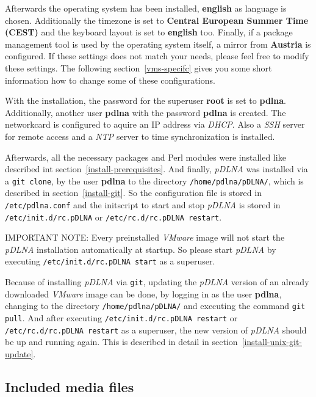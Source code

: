 \documentclass[a4paper,oneside,10pt]{report}
\newenvironment{colframeimportantnote}{%
  \begin{Sbox}
    \begin{minipage}{.99\columnwidth}
}{%
  \end{minipage}
  \end{Sbox}
  \begin{center}
    \fcolorbox{black}{Orange}{\TheSbox}
  \end{center}
}
\begin{document}
Afterwards the operating system has been installed, \textbf{english} as language is chosen. Additionally the timezone is set to \textbf{Central European Summer Time (CEST)} and the keyboard layout is set to \textbf{english} too. Finally, if a package management tool is used by the operating system itself, a mirror from \textbf{Austria} is configured. If these settings does not match your needs, please feel free to modify these settings. The following section~\ref{vms-specifc} gives you some short information how to change some of these configurations.

With the installation, the password for the superuser \textbf{root} is set to \textbf{pdlna}. Additionally, another user \textbf{pdlna} with the password \textbf{pdlna} is created. The networkcard is configured to aquire an IP address via {\em DHCP}. Also a {\em SSH} server for remote access and a {\em NTP} server to time synchronization is installed.

Afterwards, all the necessary packages and Perl modules were installed like described int section~\ref{install-prerequisites}. And finally, {\em pDLNA} was installed via a \verb|git clone|, by the user \textbf{pdlna} to the directory \verb|/home/pdlna/pDLNA/|, which is described in section~\ref{install-git}. So the configuration file is stored in \verb|/etc/pdlna.conf| and the initscript to start and stop {\em pDLNA} is stored in \verb|/etc/init.d/rc.pDLNA| or \verb|/etc/rc.d/rc.pDLNA restart|.

\begin{colframeimportantnote}
\textsc{IMPORTANT NOTE:} Every preinstalled {\em VMware} image will not start the {\em pDLNA} installation automatically at startup. So please start {\em pDLNA} by executing \verb|/etc/init.d/rc.pDLNA start| as a superuser.
\end{colframeimportantnote}

Because of installing {\em pDLNA} via \verb|git|, updating the {\em pDLNA} version of an already downloaded {\em VMware} image can be done, by logging in as the user \textbf{pdlna}, changing to the directory \verb|/home/pdlna/pDLNA/| and executing the command \verb|git pull|. And after executing \verb|/etc/init.d/rc.pDLNA restart| or \verb|/etc/rc.d/rc.pDLNA restart| as a superuser, the new version of {\em pDLNA} should be up and running again. This is described in detail in section~\ref{install-unix-git-update}.

\subsection{Included media files}
\end{document}
